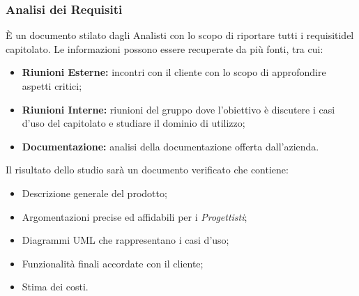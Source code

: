 \subsubsection{Analisi dei Requisiti}\label{ProcessiPrimari_Sviluppo_AnalisiRequisiti}
È un documento stilato dagli Analisti con lo scopo di riportare tutti i requisiti\glossario del capitolato. Le informazioni possono essere recuperate da più fonti, tra cui:
\begin{itemize}
	\item \textbf{Riunioni Esterne:} incontri con il cliente con lo scopo di approfondire aspetti critici;
	\item \textbf{Riunioni Interne:} riunioni del gruppo dove l'obiettivo è discutere i casi d'uso del capitolato e studiare il dominio di utilizzo;
	\item \textbf{Documentazione:} analisi della documentazione offerta dall'azienda.
\end{itemize}
Il risultato dello studio sarà un documento verificato che contiene:
\begin{itemize}
	\item Descrizione generale del prodotto;
	\item Argomentazioni precise ed affidabili per i \textit{Progettisti};
	\item Diagrammi UML che rappresentano i casi d'uso;
	\item Funzionalità finali accordate con il cliente;
	\item Stima dei costi.
\end{itemize}


